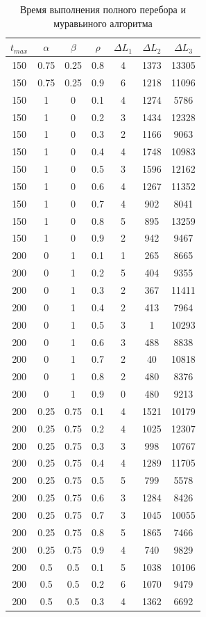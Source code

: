 \documentclass[12pt]{report}
\begin{document}
	\begin{table}[H]
		\begin{center}
			\caption[]{\label{tbl:only5} Время выполнения полного перебора и муравьиного алгоритма}
			\begin{tabular}{|c|c|c|c|c|c|c|}
				\hline
				$t_{max}$ & $\alpha$ & $\beta$ & $\rho$ & $\Delta L_{1}$ & $\Delta L_{2}$ & $\Delta L_{3}$\\
				\hline
				150 & 0.75 & 0.25 & 0.8 & 4 & 1373 & 13305 \\
				150 & 0.75 & 0.25 & 0.9 & 6 & 1218 & 11096 \\
				150 & 1 & 0 & 0.1 & 4 & 1274 & 5786 \\
				150 & 1 & 0 & 0.2 & 3 & 1434 & 12328 \\
				150 & 1 & 0 & 0.3 & 2 & 1166 & 9063 \\
				150 & 1 & 0 & 0.4 & 4 & 1748 & 10983 \\
				150 & 1 & 0 & 0.5 & 3 & 1596 & 12162 \\
				150 & 1 & 0 & 0.6 & 4 & 1267 & 11352 \\
				150 & 1 & 0 & 0.7 & 4 & 902 & 8041 \\
				150 & 1 & 0 & 0.8 & 5 & 895 & 13259 \\
				150 & 1 & 0 & 0.9 & 2 & 942 & 9467 \\
				200 & 0 & 1 & 0.1 & 1 & 265 & 8665 \\
				200 & 0 & 1 & 0.2 & 5 & 404 & 9355 \\
				200 & 0 & 1 & 0.3 & 2 & 367 & 11411 \\
				200 & 0 & 1 & 0.4 & 2 & 413 & 7964 \\
				200 & 0 & 1 & 0.5 & 3 & 1 & 10293 \\
				200 & 0 & 1 & 0.6 & 3 & 488 & 8838 \\
				200 & 0 & 1 & 0.7 & 2 & 40 & 10818 \\
				200 & 0 & 1 & 0.8 & 2 & 480 & 8376 \\
				200 & 0 & 1 & 0.9 & 0 & 480 & 9213 \\
				200 & 0.25 & 0.75 & 0.1 & 4 & 1521 & 10179 \\
				200 & 0.25 & 0.75 & 0.2 & 4 & 1025 & 12307 \\
				200 & 0.25 & 0.75 & 0.3 & 3 & 998 & 10767 \\
				200 & 0.25 & 0.75 & 0.4 & 4 & 1289 & 11705 \\
				200 & 0.25 & 0.75 & 0.5 & 5 & 799 & 5578 \\
				200 & 0.25 & 0.75 & 0.6 & 3 & 1284 & 8426 \\
				200 & 0.25 & 0.75 & 0.7 & 3 & 1045 & 10055 \\
				200 & 0.25 & 0.75 & 0.8 & 5 & 1865 & 7466 \\
				200 & 0.25 & 0.75 & 0.9 & 4 & 740 & 9829 \\
				200 & 0.5 & 0.5 & 0.1 & 5 & 1038 & 10106 \\
				200 & 0.5 & 0.5 & 0.2 & 6 & 1070 & 9479 \\
				200 & 0.5 & 0.5 & 0.3 & 4 & 1362 & 6692 \\
				\hline
			\end{tabular}
		\end{center}
	\end{table}
\end{document}
